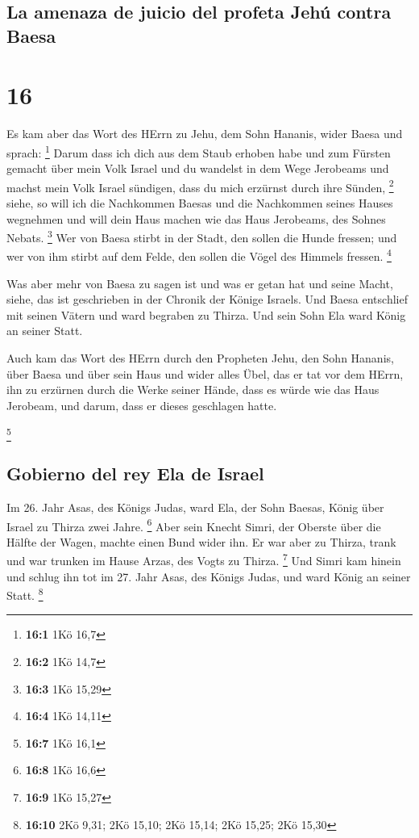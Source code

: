 \hypertarget{la-amenaza-de-juicio-del-profeta-jehuxfa-contra-baesa}{%
\subsection{La amenaza de juicio del profeta Jehú contra
Baesa}\label{la-amenaza-de-juicio-del-profeta-jehuxfa-contra-baesa}}

\hypertarget{section-15}{%
\section{16}\label{section-15}}

 Es kam aber das Wort des HErrn zu Jehu, dem Sohn Hananis,
wider Baesa und sprach: \footnote{\textbf{16:1} 1Kö 16,7} 
Darum dass ich dich aus dem Staub erhoben habe und zum Fürsten gemacht
über mein Volk Israel und du wandelst in dem Wege Jerobeams und machst
mein Volk Israel sündigen, dass du mich erzürnst durch ihre Sünden,
\footnote{\textbf{16:2} 1Kö 14,7}  siehe, so will ich die
Nachkommen Baesas und die Nachkommen seines Hauses wegnehmen und will
dein Haus machen wie das Haus Jerobeams, des Sohnes Nebats. \footnote{\textbf{16:3}
  1Kö 15,29}  Wer von Baesa stirbt in der Stadt, den
sollen die Hunde fressen; und wer von ihm stirbt auf dem Felde, den
sollen die Vögel des Himmels fressen. \footnote{\textbf{16:4} 1Kö 14,11}

 Was aber mehr von Baesa zu sagen ist und was er getan hat
und seine Macht, siehe, das ist geschrieben in der Chronik der Könige
Israels.  Und Baesa entschlief mit seinen Vätern und ward
begraben zu Thirza. Und sein Sohn Ela ward König an seiner Statt.

 Auch kam das Wort des HErrn durch den Propheten Jehu, den
Sohn Hananis, über Baesa und über sein Haus und wider alles Übel, das er
tat vor dem HErrn, ihn zu erzürnen durch die Werke seiner Hände, dass es
würde wie das Haus Jerobeam, und darum, dass er dieses geschlagen hatte.

\footnote{\textbf{16:7} 1Kö 16,1}

\hypertarget{gobierno-del-rey-ela-de-israel}{%
\subsection{Gobierno del rey Ela de
Israel}\label{gobierno-del-rey-ela-de-israel}}

 Im 26. Jahr Asas, des Königs Judas, ward Ela, der Sohn
Baesas, König über Israel zu Thirza zwei Jahre. \footnote{\textbf{16:8}
  1Kö 16,6}  Aber sein Knecht Simri, der Oberste über die
Hälfte der Wagen, machte einen Bund wider ihn. Er war aber zu Thirza,
trank und war trunken im Hause Arzas, des Vogts zu Thirza. \footnote{\textbf{16:9}
  1Kö 15,27}  Und Simri kam hinein und schlug ihn tot im
27. Jahr Asas, des Königs Judas, und ward König an seiner Statt.
\footnote{\textbf{16:10} 2Kö 9,31; 2Kö 15,10; 2Kö 15,14; 2Kö 15,25; 2Kö
  15,30}

